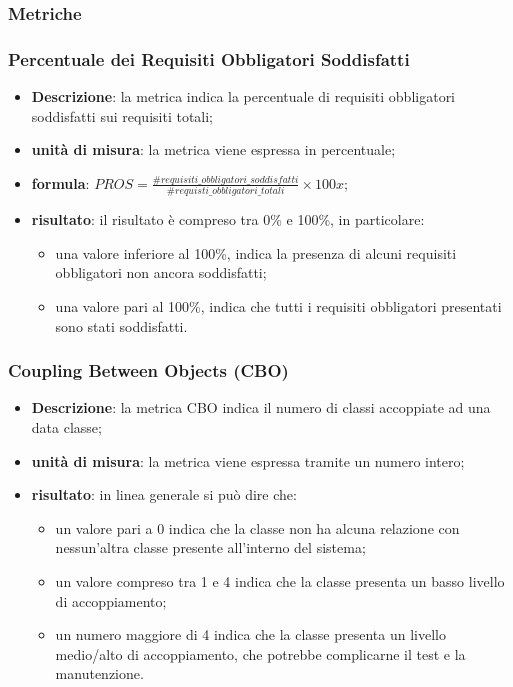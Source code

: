 \subsubsection{Metriche} 
	\subsubsection*{Percentuale dei Requisiti Obbligatori Soddisfatti}
		\begin{itemize}
			\item{\textbf{Descrizione}}: la metrica indica la percentuale di requisiti obbligatori soddisfatti sui requisiti totali; 
			\item{\textbf{unità di misura}}: la metrica viene espressa in percentuale; 
			\item{\textbf{formula}}: $ PROS = \displaystyle\frac{\#requisiti\_obbligatori\_soddisfatti}{\#requisti\_obbligatori\_totali}\times100x$; 
			\item{\textbf{risultato}}: il risultato è compreso tra 0\% e 100\%, in particolare: 
				\begin{itemize}
					\item una valore inferiore al 100\%, indica la presenza di alcuni requisiti obbligatori non ancora soddisfatti; 
					\item una valore pari al 100\%, indica che tutti i requisiti obbligatori presentati sono stati soddisfatti.  
				\end{itemize} 
		\end{itemize}

		\subsubsection*{Coupling Between Objects (CBO)}
		\begin{itemize}
			\item{\textbf{Descrizione}}: la metrica CBO indica il numero di classi accoppiate ad una data classe; 
			\item{\textbf{unità di misura}}: la metrica viene espressa tramite un numero intero;  
			\item{\textbf{risultato}}: in linea generale si può dire che: 
			\begin{itemize}
				\item un valore pari a 0 indica che la classe non ha alcuna relazione con nessun'altra classe presente all'interno del sistema; 
				\item un valore compreso tra 1 e 4 indica che la classe presenta un basso livello di accoppiamento; 
				\item un numero maggiore di 4 indica che la classe presenta un livello medio/alto di accoppiamento, che potrebbe complicarne il test e la manutenzione. 
			\end{itemize}
		\end{itemize}
	
